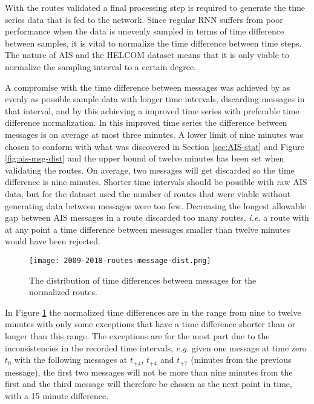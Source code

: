 \documentclass[../main.tex]{subfiles}
\begin{document}
With the routes validated a final processing step is required to generate the time series data that is fed to the network. Since regular RNN suffers from poor performance when the data is unevenly sampled in terms of time difference between samples, it is vital to normalize the time difference between time steps. The nature of AIS and the HELCOM dataset means that it is only viable to normalize the sampling interval to a certain degree.

A compromise with the time difference between messages was achieved by as evenly as possible sample data with longer time intervals, discarding messages in that interval, and by this achieving a improved time series with preferable time difference normalization. In this improved time series the difference between messages is on average at most three minutes. A lower limit of nine minutes was chosen to conform with what was discovered in Section \ref{sec:AIS-stat} and Figure \ref{fig:ais-msg-dist} and the upper bound of twelve minutes has been set when validating the routes. On average, two messages will get discarded so the time difference is nine minutes. Shorter time intervals should be possible with raw AIS data, but for the dataset used the number of routes that were viable without generating data between messages were too few. Decreasing the longest allowable gap between AIS messages in a route discarded too many routes, \textit{i.e.} a route with at any point a time difference between messages smaller than twelve minutes would have been rejected.

\begin{figure}[H]
	\centering
	\texttt{[image: 2009-2018-routes-message-dist.png]}
	\caption{The distribution of time differences between messages for the normalized routes.}
	\label{fig:norm-time}
\end{figure}

In Figure \ref{fig:norm-time} the normalized time differences are in the range from nine to twelve minutes with only some exceptions that have a time difference shorter than or longer than this range. The exceptions are for the most part due to the inconsistencies in the recorded time intervals, \textit{e.g.} given one message at time zero $t_0$ with the following messages at $t_{+4}$, $t_{+4}$ and $t_{+7}$ (minutes from the previous message), the first two messages will not be more than nine minutes from the first and the third message will therefore be chosen as the next point in time, with a 15 minute difference. 
\end{document}
